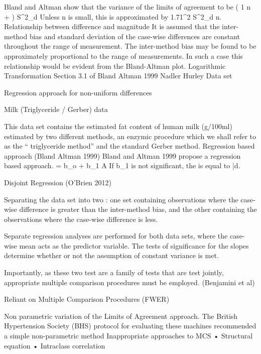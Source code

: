 
Bland and Altman show that the variance of the limits of agreement to be
\left( {1 \over n} +  \right) S^2_d
Unless n is small, this is approximated by 1.71^2 {S^2_d \over n}.
Relationship between difference and magnitude
It is assumed that the inter-method bias and standard deviation of the case-wise differences are constant throughout the range of measurement.
The inter-method bias may be found to be approximately proportional to the range of measurements. In such a case this relationship would be evident from the Bland-Altman plot.
Logarithmic Transformation
	Section 3.1 of Bland Altman 1999
	Nadler Hurley Data set

Regression approach for non-uniform differences

Milk (Triglyceride /  Gerber) data

This data set contains the estimated fat content of human milk (g/100ml) estimated by two different methods, an enzymic procedure which we shall refer to as the “ triglyceride method” and the standard Gerber method.
Regression based approach (Bland Altman 1999)
Bland and Altman 1999 propose a regression based approach.
 = b_o + b_1 A
If b_1 is not significant, the  is equal to \bar{d}.


Disjoint Regression (O’Brien 2012)

Separating the data set into two : one set containing observations where the case-wise difference is greater than the inter-method bias, and the other containing the observations where the case-wise difference is less.

Separate regression analyses are performed for both data sets, where the case-wise mean acts as the predictor variable. The tests of significance for the slopes determine whether or not the assumption of constant variance is met.

Importantly, as these two test are a family of tests that are test jointly, appropriate multiple comparison procedures must be employed.  (Benjamini et al) 

	Reliant on Multiple Comparison Procedures (FWER)


Non parametric variation of the Limits of Agreement  approach.
The British Hypertension Society (BHS) protocol for evaluating these machines recommended a simple non-parametric method
Inappropriate approaches to MCS
•	Structural equation 
•	Intraclass correlation

